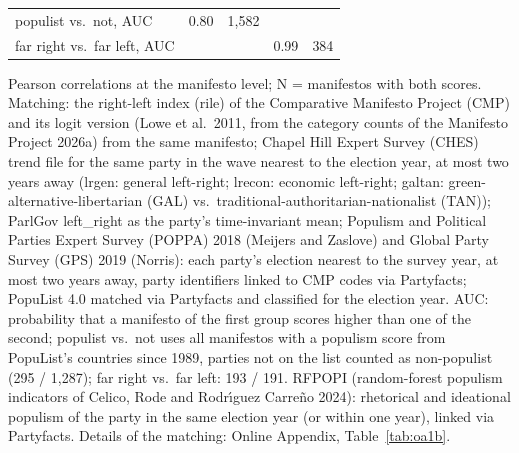 \begin{table}[ht]
{\begin{tabular}{lrrrr}
\quad populist vs.\ not, AUC & 0.80 & 1,582 & & \\
\quad far right vs.\ far left, AUC & & & 0.99 & 384 \\
\bottomrule
\end{tabular}}
\par\smallskip
\begin{minipage}{\linewidth}\scriptsize Pearson correlations at the manifesto level; N = manifestos with both scores. Matching: the right-left index (rile) of the Comparative Manifesto Project (CMP) and its logit version (Lowe et al.\ 2011, from the category counts of the Manifesto Project 2026a) from the same manifesto; Chapel Hill Expert Survey (CHES) trend file for the same party in the wave nearest to the election year, at most two years away (lrgen: general left-right; lrecon: economic left-right; galtan: green-alternative-libertarian (GAL) vs.\ traditional-authoritarian-nationalist (TAN)); ParlGov left\_right as the party's time-invariant mean; Populism and Political Parties Expert Survey (POPPA) 2018 (Meijers and Zaslove) and Global Party Survey (GPS) 2019 (Norris): each party's election nearest to the survey year, at most two years away, party identifiers linked to CMP codes via Partyfacts; PopuList 4.0 matched via Partyfacts and classified for the election year. AUC: probability that a manifesto of the first group scores higher than one of the second; populist vs.\ not uses all manifestos with a populism score from PopuList's countries since 1989, parties not on the list counted as non-populist (295 / 1,287); far right vs.\ far left: 193 / 191. RFPOPI (random-forest populism indicators of Celico, Rode and Rodr\'{\i}guez Carre\~{n}o 2024): rhetorical and ideational populism of the party in the same election year (or within one year), linked via Partyfacts.  Details of the matching: Online Appendix, Table~\ref{tab:oa1b}.\end{minipage}
\end{table}
